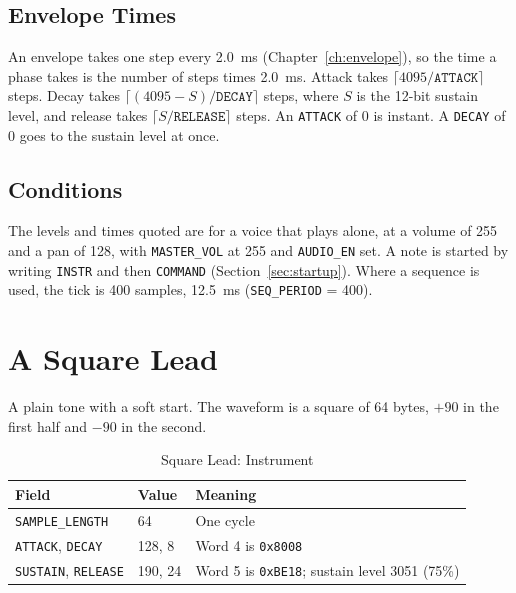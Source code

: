 \subsection{Envelope Times}

An envelope takes one step every 2.0~ms (Chapter~\ref{ch:envelope}), so the time a phase takes is the number of steps
times 2.0~ms. Attack takes $\lceil 4095 / \texttt{ATTACK} \rceil$ steps. Decay takes $\lceil (4095 - S) /
	\texttt{DECAY} \rceil$ steps, where $S$ is the 12-bit sustain level, and release takes $\lceil S / \texttt{RELEASE}
	\rceil$ steps. An \texttt{ATTACK} of 0 is instant. A \texttt{DECAY} of 0 goes to the sustain level at once.

\subsection{Conditions}

The levels and times quoted are for a voice that plays alone, at a volume of 255 and a pan of 128, with
\texttt{MASTER\_VOL} at 255 and \texttt{AUDIO\_EN} set. A note is started by writing \texttt{INSTR} and then
\texttt{COMMAND} (Section~\ref{sec:startup}). Where a sequence is used, the tick is 400 samples, 12.5~ms
(\texttt{SEQ\_PERIOD} = 400).

\section{A Square Lead}

A plain tone with a soft start. The waveform is a square of 64 bytes, $+90$ in the first half and $-90$ in the second.

\begin{table}[H]
	\centering
	\begin{tabular}{llp{6cm}}
		\toprule
		\textbf{Field}                     & \textbf{Value} & \textbf{Meaning}                                     \\
		\midrule
		\texttt{SAMPLE\_LENGTH}            & 64             & One cycle                                            \\
		\texttt{ATTACK}, \texttt{DECAY}    & 128, 8         & Word 4 is \texttt{0x8008}                            \\
		\texttt{SUSTAIN}, \texttt{RELEASE} & 190, 24        & Word 5 is \texttt{0xBE18}; sustain level 3051 (75\%) \\
		\bottomrule
	\end{tabular}
	\caption{Square Lead: Instrument}
	\label{tab:ex-lead}
\end{table}

